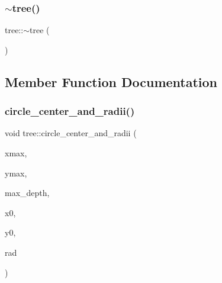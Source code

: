 \mbox{\label{classtree_a05f3faa3c9a8f6fed237e2d0f6172244}} 
\subsubsection{\texorpdfstring{$\sim$tree()}{~tree()}}
{\footnotesize\ttfamily tree\+::$\sim$tree (\begin{DoxyParamCaption}{ }\end{DoxyParamCaption})}



\subsection{Member Function Documentation}
\mbox{\label{classtree_a7e620dd9ceb89eefd92150538a59a584}} 
\subsubsection{\texorpdfstring{circle\+\_\+center\+\_\+and\+\_\+radii()}{circle\_center\_and\_radii()}}
{\footnotesize\ttfamily void tree\+::circle\+\_\+center\+\_\+and\+\_\+radii (\begin{DoxyParamCaption}\item[{\mbox{\hyperlink{galois_8h_a09fddde158a3a20bd2dcadb609de11dc}{I\+NT}}}]{xmax,  }\item[{\mbox{\hyperlink{galois_8h_a09fddde158a3a20bd2dcadb609de11dc}{I\+NT}}}]{ymax,  }\item[{\mbox{\hyperlink{galois_8h_a09fddde158a3a20bd2dcadb609de11dc}{I\+NT}}}]{max\+\_\+depth,  }\item[{\mbox{\hyperlink{galois_8h_a09fddde158a3a20bd2dcadb609de11dc}{I\+NT}} \&}]{x0,  }\item[{\mbox{\hyperlink{galois_8h_a09fddde158a3a20bd2dcadb609de11dc}{I\+NT}} \&}]{y0,  }\item[{\mbox{\hyperlink{galois_8h_a09fddde158a3a20bd2dcadb609de11dc}{I\+NT}} $\ast$\&}]{rad }\end{DoxyParamCaption})}

\mbox{\label{classtree_acfb648864efbb402a67877d1fd5dfc04}} 
